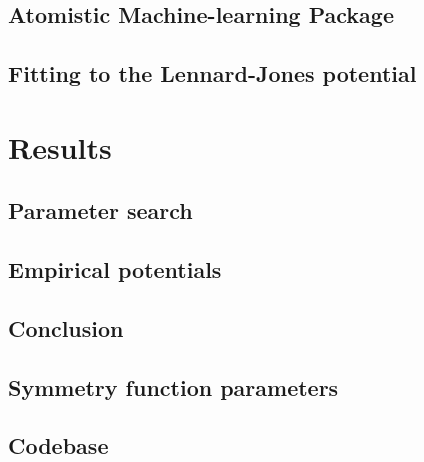 \documentclass[12pt]{report}
\begin{document}
\chapter{Atomistic Machine-learning Package}


\chapter{Fitting to the Lennard-Jones potential}


\part{Results}

\chapter{Parameter search}


\chapter{Empirical potentials}


\chapter{Conclusion}


\begin{appendices}

\chapter{Symmetry function parameters}

\chapter{Codebase}

\end{appendices}

\printbibliography
\end{document}
